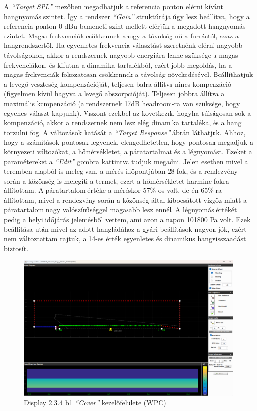 A \textit{``Target SPL''} mezőben megadhatjuk a referencia ponton elérni kívánt hangnyomás szintet.
Így a rendszer \textit{``Gain''} struktúrája úgy lesz beállítva, hogy a referencia ponton 0 dBu bemeneti szint mellett elérjük a megadott hangnyomás szintet.
Magas frekvenciák csökkennek ahogy a távolság nő a forrástól, azaz a hangrendszertől.
Ha egyenletes frekvencia választást szeretnénk elérni nagyobb távolságokon, akkor a rendszernek nagyobb energiára lenne szüksége
a magas frekvenciákon, és kifutna a dinamika tartalékból, ezért jobb megoldás, ha a magas frekvenciák fokozatosan csökkennek a távolság növekedésével.
Beállíthatjuk a levegő veszteség kompenzációját, teljesen balra állítva nincs kompenzáció (figyelmen kívül hagyva a levegő abszorpcióját).
Teljesen jobbra állítva a maximális kompenzáció (a rendszernek 17dB headroom-ra van szüksége, hogy egyenes választ kapjunk).
Viszont ezekből az következik, hogyha túlságosan sok a kompenzáció, akkor a rendszernek nem lesz elég dinamika tartaléka, és a hang torzulni fog.
A változások hatását a \textit{``Target Response''} ábrán láthatjuk.
Ahhoz, hogy a számítások pontosak legyenek, elengedhetetlen, hogy pontosan megadjuk a környezeti változókat,
a hőmérsékletet, a páratartalmat és a légnyomást. Ezeket a paramétereket a \textit{``Edit''} gombra kattintva tudjuk megadni.
Jelen esetben mivel a teremben alapból is meleg van, a mérés időpontjában 28 fok, és a rendezvény során a közönség is melegíti a termet,
ezért a hőmérsékletet harminc fokra állítottam.
A páratartalom értéke a méréskor 57\%-os volt, de én 65\%-ra állítottam, mivel a rendezvény során a közönség által kibocsátott
vízgőz miatt a páratartalom nagy valószínűséggel magasabb lesz ennél. A légnyomás értékét pedig a helyi időjárás jelentésből vettem, ami
azon a napon 101800 Pa volt. Ezek beállítása után mivel az adott hangládához a gyári beállítások nagyon jók, ezért nem változtattam rajtuk,
a 14-es érték egyenletes és dinamikus hangvisszaadást biztosít.
\begin{figure}[H]
	\centering
	\includegraphics[width=\textwidth, keepaspectratio]{figures/display_wpc_2.png}
	\caption{Display 2.3.4 b1 \textit{``Cover''} kezelőfelülete (WPC)}\label{fig:display_wpc_2}
\end{figure}
